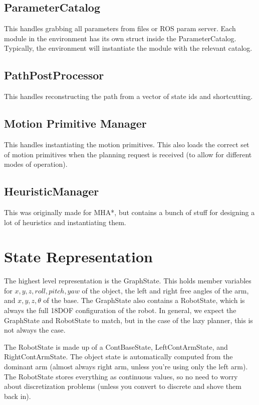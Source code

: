 \documentclass{article}
\begin{document}
\subsection{ParameterCatalog}
This handles grabbing all parameters from files or ROS param server. Each module
in the environment has its own struct inside the ParameterCatalog. Typically,
the environment will instantiate the module with the relevant catalog. 

\subsection{PathPostProcessor}
This handles reconstructing the path from a vector of state ids and
shortcutting. 

\subsection{Motion Primitive Manager}
This handles instantiating the motion primitives. This also loads the correct
set of motion primitives when the planning request is received (to allow for
different modes of operation).

\subsection{HeuristicManager}
This was originally made for MHA*, but contains a bunch of stuff for designing a
lot of heuristics and instantiating them.

\section{State Representation}
The highest level representation is the GraphState. This holds member variables
for $x, y, z, roll, pitch, yaw$ of the object, the left and right free angles of
the arm, and $x, y, z, \theta$ of the base. The GraphState also contains a 
RobotState, which is always the full 18DOF configuration of the robot. In
general, we expect the GraphState and RobotState to match, but in the case of
the lazy planner, this is not always the case.

The RobotState is made up of a ContBaseState, LeftContArmState, and
RightContArmState. The object state is automatically computed from the dominant
arm (almost always right arm, unless you're using only the left arm). The
RobotState stores everything as continuous values, so no need to worry about
discretization problems (unless you convert to discrete and shove them back in).
\end{document}
